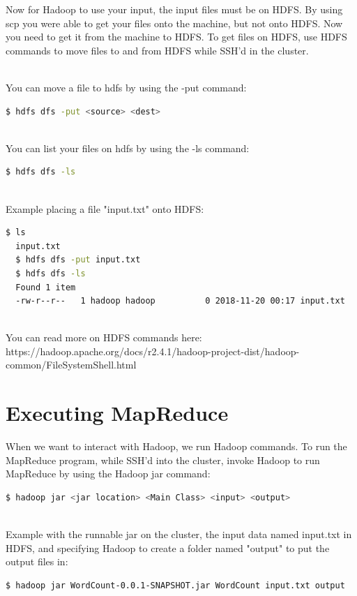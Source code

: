 \documentclass{article}
\begin{document}
Now for Hadoop to use your input, the input files must be on HDFS. By using scp you were able to get your files onto the machine, but not onto HDFS. Now you need to get it from the machine to HDFS. To get files on HDFS, use HDFS commands to move files to and from HDFS while SSH'd in the cluster.

\-\ \\You can move a file to hdfs by using the -put command:
\begin{lstlisting}[language=bash]
  $ hdfs dfs -put <source> <dest>
\end{lstlisting}    
\-\ \\You can list your files on hdfs by using the -ls command:
\begin{lstlisting}[language=bash]
  $ hdfs dfs -ls 
\end{lstlisting} 
\-\ \\Example placing a file "input.txt" onto HDFS:
\begin{lstlisting}[language=bash]
  $ ls
  input.txt
  $ hdfs dfs -put input.txt 
  $ hdfs dfs -ls 
  Found 1 item 
  -rw-r--r--   1 hadoop hadoop          0 2018-11-20 00:17 input.txt
\end{lstlisting} 

\-\ \\ You can read more on HDFS commands here:\\ https://hadoop.apache.org/docs/r2.4.1/hadoop-project-dist/hadoop-common/FileSystemShell.html
 


\section{Executing MapReduce}
When we want to interact with Hadoop, we run Hadoop commands. To run the MapReduce program, while SSH'd into the cluster, invoke Hadoop to run MapReduce by using the Hadoop jar command:
\begin{lstlisting}[language=bash]
  $ hadoop jar <jar location> <Main Class> <input> <output>
\end{lstlisting}
\-\ \\Example with the runnable jar on the cluster, the input data named input.txt in HDFS, and specifying Hadoop to create a folder named "output" to put the output files in:
\begin{lstlisting}[language=bash]
  $ hadoop jar WordCount-0.0.1-SNAPSHOT.jar WordCount input.txt output
\end{lstlisting}
\end{document}
